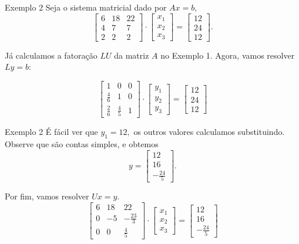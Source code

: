 \documentclass[]{beamer}
\begin{document}
\begin{frame}{Exemplo 2}
Seja o sistema matricial dado por $Ax=b,$
$$\begin{bmatrix}6&18&22\\ 4&7&7\\ 2&2&2\end{bmatrix}\cdot \begin{bmatrix}x_1\\ x_2\\ x_3\end{bmatrix}=\begin{bmatrix}12\\ 24\\ 12\end{bmatrix}.$$

Já calculamos a fatoração $LU$ da matriz $A$ no Exemplo 1. Agora, vamos resolver $Ly=b:$

$$\begin{bmatrix}1&0&0\\ \frac{4}{6}&1&0\\ \frac{2}{6}&\frac{4}{5}&1\end{bmatrix}\cdot \begin{bmatrix}y_1\\ y_2\\ y_3\end{bmatrix}=\begin{bmatrix}12\\ 24\\ 12\end{bmatrix}$$

\end{frame}

\begin{frame}{Exemplo 2}
É fácil ver que $y_1=12,$ os outros valores calculamos substituindo. Observe que são contas simples, e obtemos $$y=\begin{bmatrix}12\\ 16\\ -\frac{24}{5}\end{bmatrix}.$$

Por fim, vamos resolver $Ux=y.$
$$\begin{bmatrix}6&18&22\\ 0&-5&-\frac{23}{3}\\ 0&0&\frac{4}{5}\end{bmatrix}\cdot \begin{bmatrix}x_1\\ x_2\\ x_3\end{bmatrix}=\begin{bmatrix}12\\ 16\\ -\frac{24}{5}\end{bmatrix}$$
\end{frame}
\end{document}
